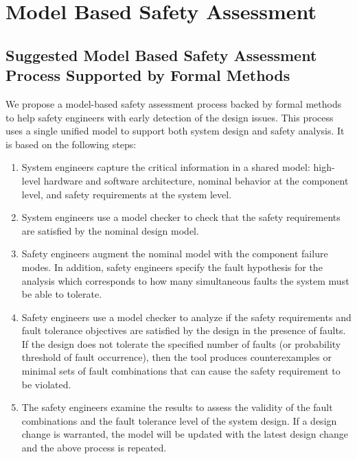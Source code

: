 \section{Model Based Safety Assessment}
\label{sec:mbsa}


\subsection{Suggested Model Based Safety Assessment Process Supported by Formal Methods}
We propose a model-based safety assessment process backed by formal methods to help safety engineers with early detection of the design issues.  This process uses a single unified model to support both system design and safety analysis. It is based on the following steps:

\begin{enumerate}
	\item System engineers capture the critical information in a shared model:  high-level hardware and software architecture, nominal behavior at the component level, and safety requirements at the system level.
	\item System engineers use a model checker to check that the safety requirements are satisfied by the nominal design model. 
	\item Safety engineers augment the nominal model with the component failure modes. In addition, safety engineers specify the fault hypothesis for the analysis which corresponds to how many simultaneous faults the system must be able to tolerate.
	\item Safety engineers use a model checker to analyze if the safety requirements and fault tolerance objectives are satisfied by the design in the presence of faults. 
	If the design does not tolerate the specified number of faults (or probability threshold of fault occurrence), then the tool produces counterexamples or minimal sets of fault combinations that can cause the safety requirement to be violated.
	\item The safety engineers examine the results to assess the validity of the fault combinations and the fault tolerance level of the system design. If a design change is warranted, the model will be updated with the latest design change and the above process is repeated.
\end{enumerate}

